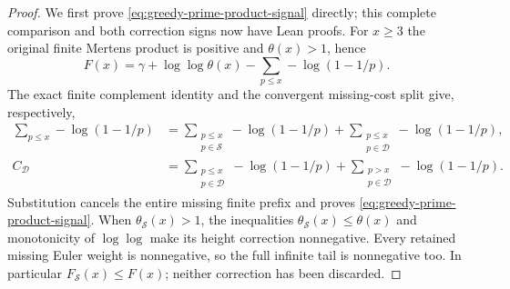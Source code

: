 \documentclass[11pt]{article}
\theoremstyle{definition}
\begin{document}
\begin{proof}
We first prove \eqref{eq:greedy-prime-product-signal} directly;
this complete comparison and both correction signs now have Lean proofs.
For $x\ge3$ the original finite Mertens product is positive and
$\theta(x)>1$, hence
\[
 F(x)=\gamma+\log\log\theta(x)
       -\sum_{p\le x}-\log(1-1/p).
\]
The exact finite complement identity and the convergent missing-cost
split give, respectively,
\[
 \begin{aligned}
 \sum_{p\le x}-\log(1-1/p)
  &=\sum_{\substack{p\le x\\p\in\mathcal S}}-\log(1-1/p)
    +\sum_{\substack{p\le x\\p\in\mathcal D}}-\log(1-1/p),\\
 C_{\mathcal D}
  &=\sum_{\substack{p\le x\\p\in\mathcal D}}-\log(1-1/p)
    +\sum_{\substack{p>x\\p\in\mathcal D}}-\log(1-1/p).
 \end{aligned}
\]
Substitution cancels the entire missing finite prefix and proves
\eqref{eq:greedy-prime-product-signal}.
When $\theta_{\mathcal S}(x)>1$, the inequalities
$\theta_{\mathcal S}(x)\le\theta(x)$ and monotonicity of $\log\log$
make its height correction nonnegative.
Every retained missing Euler weight is nonnegative, so the full
infinite tail is nonnegative too. In particular $F_{\mathcal S}(x)\le F(x)$;
neither correction has been discarded.


\end{proof}
\end{document}
